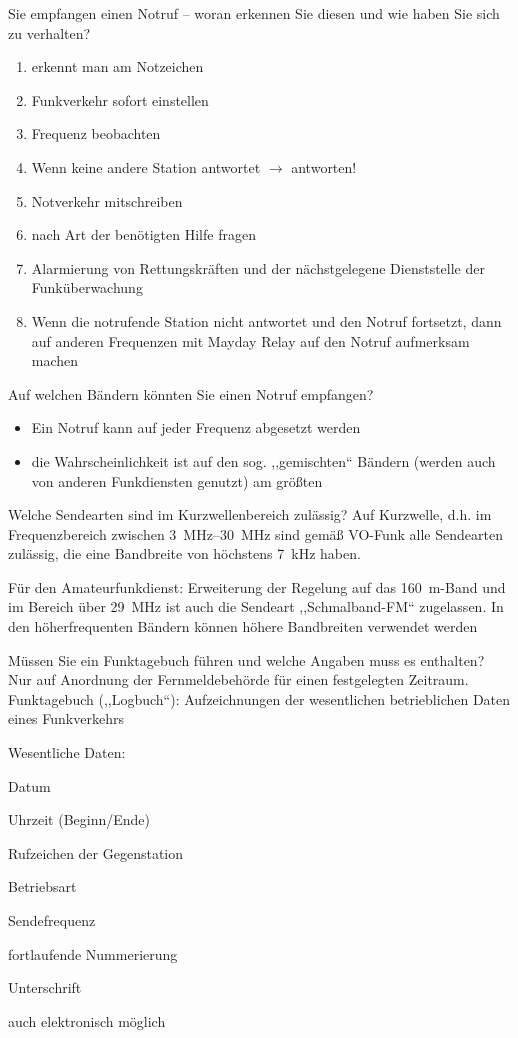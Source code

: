 \documentclass[avery5371,grid,frame,a4paper]{flashcards}
\newcommand{\card}[3]{
  \begin{flashcard}[{\chap} -- #1]{#2}#3\end{flashcard}
}
\begin{document}
\card{34}{Sie empfangen einen Notruf – woran erkennen Sie diesen und wie haben Sie sich zu verhalten?}{
  \footnotesize
  \begin{enumerate}[itemsep=0pt]
    \item erkennt man am Notzeichen
    \item Funkverkehr sofort einstellen
    \item Frequenz beobachten
    \item Wenn keine andere Station antwortet $\rightarrow$ antworten!
    \item Notverkehr mitschreiben
    \item nach Art der benötigten Hilfe fragen
    \item Alarmierung von Rettungskräften und der nächstgelegene Dienststelle der Funküberwachung
    \item Wenn die notrufende Station nicht antwortet und den Notruf fortsetzt, dann auf anderen Frequenzen mit Mayday Relay auf den Notruf aufmerksam machen
  \end{enumerate}
}
\card{35}{Auf welchen Bändern könnten Sie einen Notruf empfangen?}{
  \begin{itemize}
    \item Ein Notruf kann auf jeder Frequenz abgesetzt werden
    \item die Wahrscheinlichkeit ist auf den sog. ,,gemischten`` Bändern (werden auch von anderen Funkdiensten genutzt) am größten
  \end{itemize}
}
\card{36}{Welche Sendearten sind im Kurzwellenbereich zulässig?}{
  Auf Kurzwelle, d.h. im Frequenzbereich zwischen \SIrange{3}{30}{\mega\Hz} sind gemäß VO-Funk alle Sendearten zulässig, die eine Bandbreite von höchstens \SI{7}{\kilo\Hz} haben.

  Für den Amateurfunkdienst: Erweiterung der Regelung auf das \SI{160}{\metre}-Band und im Bereich über \SI{29}{\mega\Hz} ist auch die Sendeart ,,Schmalband-FM`` zugelassen. In den höherfrequenten Bändern können höhere Bandbreiten verwendet werden
}
\card{37}{Müssen Sie ein Funktagebuch führen und welche Angaben muss es enthalten?}{
  Nur auf Anordnung der Fernmeldebehörde für einen festgelegten Zeitraum.
  Funktagebuch (,,Logbuch``): Aufzeichnungen der wesentlichen betrieblichen Daten eines Funkverkehrs

  Wesentliche Daten:
  \begin{itemize*}
    \item Datum
    \item Uhrzeit (Beginn/Ende)
    \item Rufzeichen der Gegenstation
    \item Betriebsart
    \item Sendefrequenz
    \item fortlaufende Nummerierung
    \item Unterschrift
    \item auch elektronisch möglich
  \end{itemize*}
}
\end{document}
